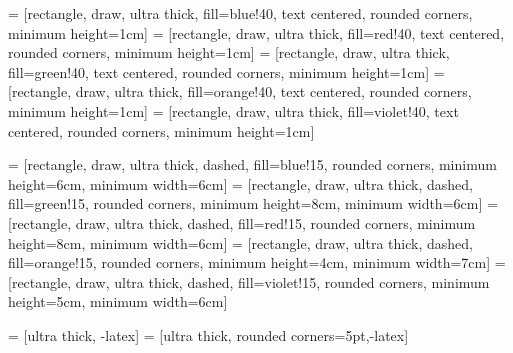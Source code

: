 \documentclass[10pt]{article}
\begin{document}

 = [rectangle, draw, ultra thick, fill=blue!40, 
    text centered, rounded corners, minimum height=1cm]
 = [rectangle, draw, ultra thick, fill=red!40, 
    text centered, rounded corners, minimum height=1cm]
 = [rectangle, draw, ultra thick, fill=green!40, 
    text centered, rounded corners, minimum height=1cm]
 = [rectangle, draw, ultra thick, fill=orange!40, 
    text centered, rounded corners, minimum height=1cm]
 = [rectangle, draw, ultra thick, fill=violet!40, 
    text centered, rounded corners, minimum height=1cm]

 = [rectangle, draw, ultra thick, dashed, 
    fill=blue!15, rounded corners, minimum height=6cm, minimum width=6cm]
 = [rectangle, draw, ultra thick, dashed, 
    fill=green!15, rounded corners, minimum height=8cm, minimum width=6cm]
 = [rectangle, draw, ultra thick, dashed, 
    fill=red!15, rounded corners, minimum height=8cm, minimum width=6cm]
 = [rectangle, draw, ultra thick, dashed, 
    fill=orange!15, rounded corners, minimum height=4cm, minimum width=7cm]
 = [rectangle, draw, ultra thick, dashed, 
    fill=violet!15, rounded corners, minimum height=5cm, minimum width=6cm]

 = [ultra thick, -latex]
 = [ultra thick, rounded corners=5pt,-latex]

\vspace*{\fill}
\end{document}
